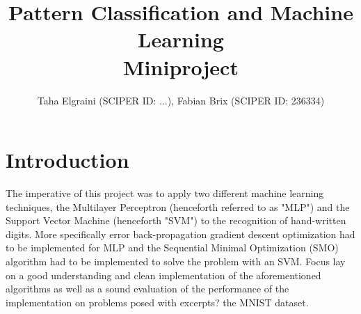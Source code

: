 \documentclass[10pt,a4paper]{article}
\title{Pattern Classification and Machine Learning\\\Huge Miniproject}
\author{Taha Elgraini (SCIPER ID: ...), Fabian Brix (SCIPER ID: 236334)}
\begin{document}
\maketitle

\section{Introduction}
The imperative of this project was to apply two different machine learning techniques, the Multilayer Perceptron (henceforth referred to as "MLP") and the Support Vector Machine (henceforth "SVM") to the recognition of hand-written digits. More specifically error back-propagation gradient descent optimization had to be implemented for MLP and the Sequential Minimal Optimization (SMO) algorithm had to be implemented to solve the problem with an SVM. Focus lay on a good understanding and clean implementation of the aforementioned algorithms as well as a sound evaluation of the performance of the implementation on problems posed with excerpts? the MNIST dataset.


\end{document}
